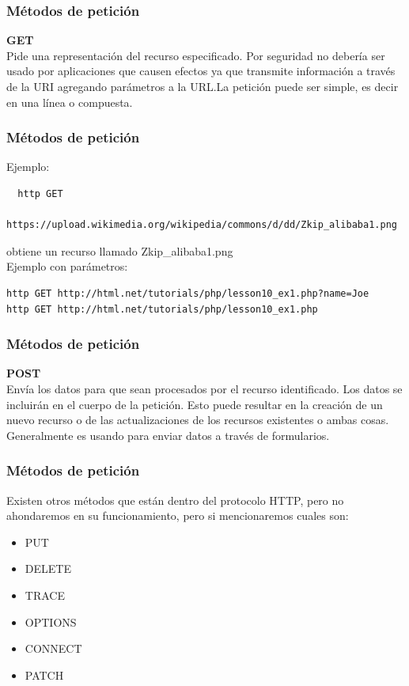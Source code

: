 \documentclass{beamer}
\begin{document}
\begin{frame}[fragile]
  \frametitle{Métodos de petición}
  \textbf{GET}\\
  Pide una representación del recurso especificado. Por seguridad no
  debería ser usado por aplicaciones que causen efectos ya que
  transmite información a través de la URI agregando parámetros a la
  URL.\@ La petición puede ser simple, es decir en una línea o compuesta.
\end{frame}

\begin{frame}[fragile]
  \frametitle{Métodos de petición}
  Ejemplo:
\begin{verbatim}
  http GET
  https://upload.wikimedia.org/wikipedia/commons/d/dd/Zkip_alibaba1.png
\end{verbatim}
obtiene un recurso llamado Zkip\_alibaba1.png\\
Ejemplo con parámetros:
\begin{verbatim}
http GET http://html.net/tutorials/php/lesson10_ex1.php?name=Joe
http GET http://html.net/tutorials/php/lesson10_ex1.php
\end{verbatim}

\end{frame}

\begin{frame}
  \frametitle{Métodos de petición}
  \textbf{POST}\\
Envía los datos para que sean procesados por el recurso
identificado. Los datos se incluirán en el cuerpo de la
petición. Esto puede resultar en la creación de un nuevo recurso o de
las actualizaciones de los recursos existentes o ambas
cosas. Generalmente es usando para enviar datos a través de
formularios.
\end{frame}

\begin{frame}
  \frametitle{Métodos de petición}
  Existen otros métodos que están dentro del protocolo HTTP, pero no
  ahondaremos en su funcionamiento, pero si mencionaremos cuales son:

  \begin{itemize}
  \item PUT
  \item DELETE
  \item TRACE
  \item OPTIONS
  \item CONNECT
  \item PATCH
  \end{itemize}
\end{frame}
\end{document}
